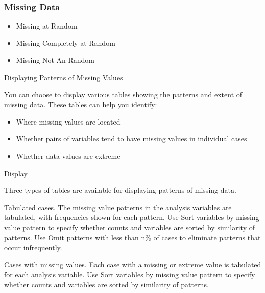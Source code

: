 \documentclass[MASTER.tex]{subfiles}
\begin{document}
	\begin{frame}
\frametitle{Missing Data}
		\Large
\begin{itemize}
\item Missing at Random
\item Missing Completely at Random
\item Missing Not An Random
\end{itemize}
	\end{frame}
	\begin{frame}
		\Large
		Displaying Patterns of Missing Values

You can choose to display various tables showing the patterns and extent of missing data. These tables can help you identify:

\begin{itemize}
\item Where missing values are located

\item Whether pairs of variables tend to have missing values in individual cases

\item Whether data values are extreme
\end{itemize}

	\end{frame}
	\begin{frame}
		\Large
		
Display

Three types of tables are available for displaying patterns of missing data.

Tabulated cases. The missing value patterns in the analysis variables are tabulated, with frequencies shown for each pattern. Use Sort variables by missing value pattern to specify whether counts and variables are sorted by similarity of patterns. Use Omit patterns with less than n\% of cases to eliminate patterns that occur infrequently.

Cases with missing values. Each case with a missing or extreme value is tabulated for each analysis variable. Use Sort variables by missing value pattern to specify whether counts and variables are sorted by similarity of patterns.
	\end{frame}
\end{document}
